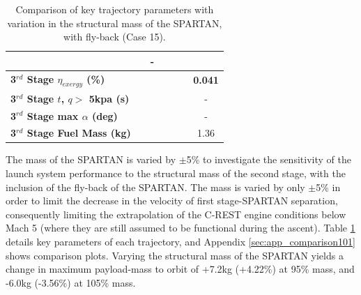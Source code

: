 \begin{table}[ht]
\begin{tabular}{l c c c c c c}
	& \returnFuelmSPARTANOneHundredFive
	& -
	\\
	\hline 
	\textbf{3$^{rd}$ Stage $\eta_{exergy}$ (\%)}
	& \textbf{\thirddExergyEffmSPARTANNinetyFive}
	& \textbf{\thirddExergyEffmSPARTANNinetySevenFive}
	& \textbf{\thirddExergyEffmSPARTANStandard}
	& \textbf{\thirddExergyEffmSPARTANOneHundredTwoFive}
	& \textbf{\thirddExergyEffmSPARTANOneHundredFive}
	& \textbf{0.041}
	\\
	\textbf{3$^{rd}$ Stage $t$, $q >$ 5kpa (s)}
	& \thirdqOverFivemSPARTANNinetyFive
	& \thirdqOverFivemSPARTANNinetySevenFive
	& \thirdqOverFivemSPARTANStandard
	& \thirdqOverFivemSPARTANOneHundredTwoFive
	& \thirdqOverFivemSPARTANOneHundredFive
	& -
	\\
	\textbf{3$^{rd}$ Stage max $\alpha$ (deg)}
	& \thirdmaxAoAmSPARTANNinetyFive
	& \thirdmaxAoAmSPARTANNinetySevenFive
	& \thirdmaxAoAmSPARTANStandard
	& \thirdmaxAoAmSPARTANOneHundredTwoFive
	& \thirdmaxAoAmSPARTANOneHundredFive
	& -
	\\
	\textbf{3$^{rd}$ Stage Fuel Mass (kg)}
	& \thirdmFuelmSPARTANNinetyFive
	& \thirdmFuelmSPARTANNinetySevenFive
	& \thirdmFuelmSPARTANStandard
	& \thirdmFuelmSPARTANOneHundredTwoFive
	& \thirdmFuelmSPARTANOneHundredFive
	&1.36
	\\
	\hline 
\end{tabular}
\caption{Comparison of key trajectory parameters with variation in the structural mass of the SPARTAN, with fly-back (Case 15).}
\label{tab:comparison101}
\end{table}


The mass of the SPARTAN is varied by $\pm$5\% to investigate the sensitivity of the launch system performance to the structural mass of the second stage, with the inclusion of the fly-back of the SPARTAN. The mass is varied by only $\pm$5\% in order to limit the decrease in the velocity of first stage-SPARTAN separation, consequently limiting the extrapolation of the C-REST engine conditions below Mach 5 (where they are still assumed to be functional during the ascent).
Table \ref{tab:comparison101} details key parameters of each trajectory, and Appendix \ref{sec:app_comparison101} shows comparison plots.
Varying the structural mass of the SPARTAN yields a change in maximum payload-mass to orbit of +7.2kg (+4.22\%) at 95\% mass, and -6.0kg (-3.56\%) at 105\% mass. 

